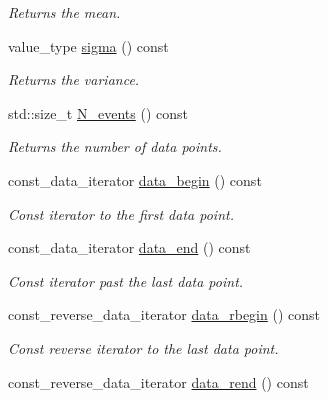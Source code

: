 \begin{DoxyCompactItemize}
\begin{DoxyCompactList}\small\item\em Returns the mean. \end{DoxyCompactList}\item 
\hypertarget{a00284_ac3cba0f0df4b82262ce92381895c8879}{}value\+\_\+type \hyperlink{a00284_ac3cba0f0df4b82262ce92381895c8879}{sigma} () const \label{a00284_ac3cba0f0df4b82262ce92381895c8879}

\begin{DoxyCompactList}\small\item\em Returns the variance. \end{DoxyCompactList}\item 
\hypertarget{a00284_ab4c1f9ec5a51b4973c1522382ee9e558}{}std\+::size\+\_\+t \hyperlink{a00284_ab4c1f9ec5a51b4973c1522382ee9e558}{N\+\_\+events} () const \label{a00284_ab4c1f9ec5a51b4973c1522382ee9e558}

\begin{DoxyCompactList}\small\item\em Returns the number of data points. \end{DoxyCompactList}\item 
\hypertarget{a00284_a8430fe1342b11c173c53f1e7c4c4c928}{}const\+\_\+data\+\_\+iterator \hyperlink{a00284_a8430fe1342b11c173c53f1e7c4c4c928}{data\+\_\+begin} () const \label{a00284_a8430fe1342b11c173c53f1e7c4c4c928}

\begin{DoxyCompactList}\small\item\em Const iterator to the first data point. \end{DoxyCompactList}\item 
\hypertarget{a00284_a297ca8e89ce33201bb6531ded246b891}{}const\+\_\+data\+\_\+iterator \hyperlink{a00284_a297ca8e89ce33201bb6531ded246b891}{data\+\_\+end} () const \label{a00284_a297ca8e89ce33201bb6531ded246b891}

\begin{DoxyCompactList}\small\item\em Const iterator past the last data point. \end{DoxyCompactList}\item 
\hypertarget{a00284_a40d0017be4fd229d7ade1b6b6ff65286}{}const\+\_\+reverse\+\_\+data\+\_\+iterator \hyperlink{a00284_a40d0017be4fd229d7ade1b6b6ff65286}{data\+\_\+rbegin} () const \label{a00284_a40d0017be4fd229d7ade1b6b6ff65286}

\begin{DoxyCompactList}\small\item\em Const reverse iterator to the last data point. \end{DoxyCompactList}\item 
\hypertarget{a00284_ad3ba48fe67c2225ae2b134884029b55c}{}const\+\_\+reverse\+\_\+data\+\_\+iterator \hyperlink{a00284_ad3ba48fe67c2225ae2b134884029b55c}{data\+\_\+rend} () const \label{a00284_ad3ba48fe67c2225ae2b134884029b55c}


\end{DoxyCompactItemize}
